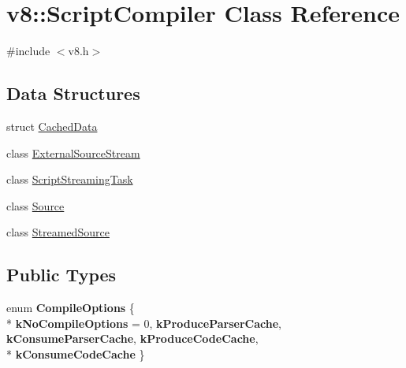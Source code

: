\hypertarget{classv8_1_1ScriptCompiler}{}\section{v8\+:\+:Script\+Compiler Class Reference}
\label{classv8_1_1ScriptCompiler}


{\ttfamily \#include $<$v8.\+h$>$}

\subsection*{Data Structures}
\begin{DoxyCompactItemize}
\item 
struct \hyperlink{structv8_1_1ScriptCompiler_1_1CachedData}{Cached\+Data}
\item 
class \hyperlink{classv8_1_1ScriptCompiler_1_1ExternalSourceStream}{External\+Source\+Stream}
\item 
class \hyperlink{classv8_1_1ScriptCompiler_1_1ScriptStreamingTask}{Script\+Streaming\+Task}
\item 
class \hyperlink{classv8_1_1ScriptCompiler_1_1Source}{Source}
\item 
class \hyperlink{classv8_1_1ScriptCompiler_1_1StreamedSource}{Streamed\+Source}
\end{DoxyCompactItemize}
\subsection*{Public Types}
\begin{DoxyCompactItemize}
\item 
\hypertarget{classv8_1_1ScriptCompiler_aa6db7774ab5d8793cd88db6b35a71818}{}enum {\bfseries Compile\+Options} \{ \\*
{\bfseries k\+No\+Compile\+Options} = 0, 
{\bfseries k\+Produce\+Parser\+Cache}, 
{\bfseries k\+Consume\+Parser\+Cache}, 
{\bfseries k\+Produce\+Code\+Cache}, 
\\*
{\bfseries k\+Consume\+Code\+Cache}
 \}\label{classv8_1_1ScriptCompiler_aa6db7774ab5d8793cd88db6b35a71818}

\end{DoxyCompactItemize}
